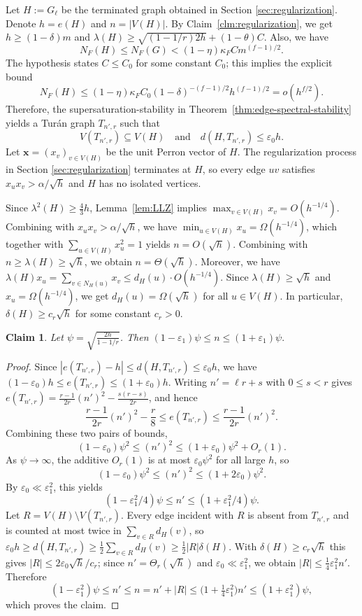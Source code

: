 \documentclass[11pt,a4paper]{article}
\newtheorem{claim}[theorem]{Claim}
\theoremstyle{definition}
\theoremstyle{plain}
\newcommand{\eps}{\varepsilon}
\renewcommand{\le}{\leqslant}
\renewcommand{\ge}{\geqslant}
\begin{document}
Let $H:=G_{\ell}$ be the terminated graph obtained in Section \ref{sec:regularization}.  
Denote $h=e(H)$ and $  n=|V(H)|$. 
By Claim~\ref{clm:regularization}, 
we get 
$  h\ge(1-\delta)m$ 
and
$ \lambda(H)
  \ge \sqrt{(1- {1}/{r}) 2h}+(1-\theta)C.$ 
Also, we have $$ N_F(H)\le N_F(G)< (1- \eta)\kappa_F C m^{(f-1)/2}.$$ 
The hypothesis states $C\le C_0$ for some constant $C_0$; this implies the explicit bound
\[
  N_F(H)
  \le
 (1- \eta)\kappa_F C_0(1-\delta)^{-(f-1)/2}h^{(f-1)/2} = o(h^{f/2}).
\]
Therefore, the supersaturation-stability in  Theorem~\ref{thm:edge-spectral-stability} yields a Tur\'an graph $T_{n',r}$ such that 
\[   V(T_{n',r})\subseteq V(H) 
\quad \text{and} \quad d(H,T_{n',r})\le \eps_0 h. \]
Let $\bm{x}=(x_v)_{v\in V(H)}$  be the unit Perron vector of $H$. 
 The regularization process in Section \ref{sec:regularization} terminates at $H$, so every edge $uv$ satisfies $x_ux_v>\alpha/\sqrt h$ and $H$ has no isolated vertices.   
 
Since  $  \lambda^2(H) \ge \frac43h$, 
Lemma~\ref{lem:LLZ} implies 
$\max_{v\in V(H)} x_v =O(h^{-1/4})$. 
Combining with  
$x_ux_v > \alpha / \sqrt{h}$, we have $\min_{u\in V(H)} x_u = \Omega (h^{-1/4})$, which together with $\sum_{u\in V(H)} x_u^2 =1$ yields $ n=O(\sqrt h)$. Combining with $n\ge \lambda (H) \ge \sqrt{h}$, we obtain 
$n= \Theta (\sqrt{h}). $  
Moreover, we have $ \lambda (H) x_u = \sum_{v\in N_H(u)} x_v  \le d_H(u) \cdot O(h^{-1/4})$. Since $\lambda (H) \ge \sqrt{h}$ and $x_u = \Omega(h^{-1/4})$, we get 
$ d_H(u) =\Omega (\sqrt{h})$ for all $u\in V(H)$. 
In particular, $\delta(H)\ge c_r \sqrt h$ for some constant $c_r>0$. 




\begin{claim}\label{clm:n-size}
Let $ \psi=\sqrt{\frac{2h}{1-1/r}}$. Then 
$ (1-\eps_1)\psi\le n\le (1+\eps_1)\psi.$
\end{claim}

\begin{proof}
 Since  $|e(T_{n',r})-h|\le d(H,T_{n',r})\le\eps_0h$,
we have $(1-\eps_0)h\le e(T_{n',r})\le(1+\eps_0)h$. Writing $n'= \ell r+s$ with $0\le s<r$ gives
$e(T_{n',r})=\frac{r-1}{2r}(n')^2-\frac{s(r-s)}{2r}$, and hence
$$\frac{r-1}{2r}(n')^2-\frac r8\le e(T_{n',r})\le\frac{r-1}{2r}(n')^2.$$ 
Combining these two pairs
of bounds,
\[
  (1-\eps_0)\psi^2\le (n')^2\le (1+\eps_0)\psi^2+O_r(1).
\]
As $\psi\to\infty$, the additive $O_r(1)$ is at most $\eps_0\psi^2$ for all large $h$, so
$$(1-\eps_0)\psi^2\le (n')^2\le(1+2\eps_0)\psi^2.$$
 By $\eps_0\ll\eps_1^2$, this yields
\[
  (1-\eps_1^2/4)\psi\le n'\le (1+\eps_1^2/4)\psi.
\]
Let $R=V(H)\setminus V(T_{n',r})$. Every edge incident with $R$ is absent from $T_{n',r}$
and is counted at most twice in $\sum_{v\in R}d_H(v)$, so
$\eps_0h\ge d(H,T_{n',r})\ge\frac12\sum_{v\in R}d_H(v)\ge\frac12|R|\delta(H)$. With
$\delta(H)\ge c_r \sqrt h$ this gives $|R|\le 2\eps_0\sqrt h/c_r $; since
$n'=\Theta_r(\sqrt h)$ and $\eps_0\ll\eps_1^2$, we obtain $|R|\le \frac{1}{4}{\eps_1^2}n'$.
Therefore
\[
  (1-\eps_1^2)\psi\le n'\le n=n'+|R|\le 
  \big(1+ \tfrac{1}{4}{\eps_1^2} \big)n'\le (1+\eps_1^2)\psi,
\]
which proves the claim.
\end{proof}
\end{document}
